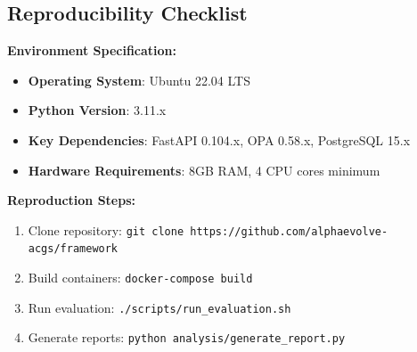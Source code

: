 \documentclass[sigconf,natbib]{acmart}
\begin{document}
\subsection{Reproducibility Checklist}
\textbf{Environment Specification:}
\begin{itemize}
    \item \textbf{Operating System}: Ubuntu 22.04 LTS
    \item \textbf{Python Version}: 3.11.x
    \item \textbf{Key Dependencies}: FastAPI 0.104.x, OPA 0.58.x, PostgreSQL 15.x
    \item \textbf{Hardware Requirements}: 8GB RAM, 4 CPU cores minimum
\end{itemize}

\textbf{Reproduction Steps:}
\begin{enumerate}
    \item Clone repository: \texttt{git clone https://github.com/alphaevolve-acgs/framework}
    \item Build containers: \texttt{docker-compose build}
    \item Run evaluation: \texttt{./scripts/run\_evaluation.sh}
    \item Generate reports: \texttt{python analysis/generate\_report.py}
\end{enumerate}
\end{document}
